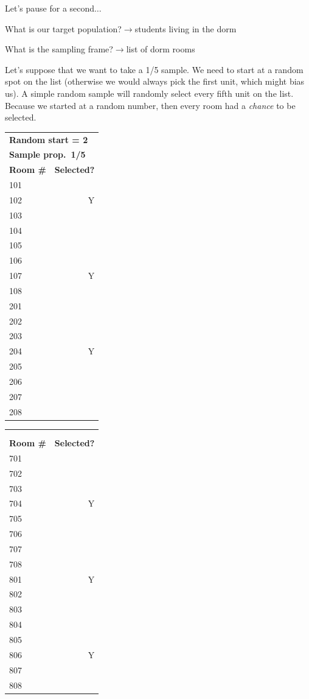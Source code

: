 \documentclass[11pt]{lecturenotes}
\begin{document}
Let's pause for a second$\ldots$

What is our target population?$\longrightarrow$students living in the dorm

What is the sampling frame?$\longrightarrow$list of dorm rooms

Let's suppose that we want to take a 1/5 sample. We need to start at a random spot on the list (otherwise we would always pick the first unit, which might bias us). A simple random sample will randomly select every fifth unit on the list. Because we started at a random number, then every room had a \emph{chance} to be selected. 

\begin{center}
\slide
\small
\begin{minipage}{.4\textwidth}
\begin{tabular}{lr}
\multicolumn{2}{l}{\textbf{Random start = 2}} \\
\multicolumn{2}{l}{\textbf{Sample prop.\ 1/5}} \\
\textbf{Room \#} & \textbf{Selected?} \\ \toprule
101 & \\
102 & Y \\
103 & \\
104 & \\ 
105 & \\
106 & \\ 
107 &Y  \\
108 & \\
201 & \\
202 & \\
203 & \\
204 &Y \\ 
205 & \\
206 & \\ 
207 & \\
208 &\\ \bottomrule
\end{tabular}
\end{minipage}\begin{minipage}{.4\textwidth}
\begin{tabular}{lr}
\multicolumn{2}{l}{} \\
\multicolumn{2}{l}{} \\
\textbf{Room \#} & \textbf{Selected?} \\ \toprule
701 & \\
702 &  \\
703 & \\
704 &Y  \\ 
705 & \\
706 & \\ 
707 & \\
708 &\\
801 & Y \\
802 &  \\
803 & \\
804 & \\ 
805 & \\
806 & Y \\ 
807 & \\
808 &\\ \bottomrule
\end{tabular}
\end{minipage}
\end{center}
\end{document}
